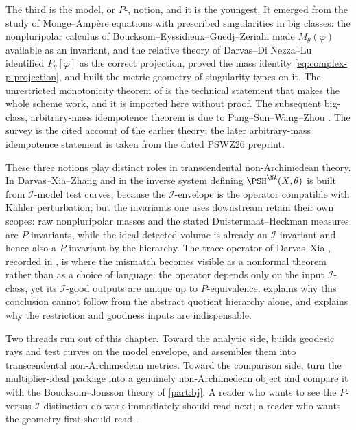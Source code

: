 The third is the model, or $P$-, notion, and it is the youngest.  It
emerged from the study of Monge--Amp\`ere equations with prescribed
singularities in big classes: the nonpluripolar calculus of
Boucksom--Eyssidieux--Guedj--Zeriahi \cite{BEGZ10} made
$M_\theta(\varphi)$ available as an invariant, and the relative theory
of Darvas--Di Nezza--Lu \cite{DDNL18mono,DDNL18big,DDNL18fullmass,%
DDNL19log,DDNLmetric} identified $P_\theta[\varphi]$ as the correct
projection, proved the mass identity \eqref{eq:complex-p-projection}, and
built the metric geometry of singularity types on it.  The unrestricted
monotonicity theorem of \cite{DDNL18mono} is the technical statement that
makes the whole scheme work, and it is imported here without proof.  The
subsequent big-class, arbitrary-mass idempotence theorem is due to
Pang--Sun--Wang--Zhou \cite{PSWZ26}.  The survey \cite{DDNLsurv} is the
cited account of the earlier theory; the later arbitrary-mass
idempotence statement is taken from the dated PSWZ26 preprint.

These three notions play distinct roles in transcendental
non-Archimedean theory.  In
Darvas--Xia--Zhang \cite{DXZ23} and in \cite{Xia21,Xia23Operations} the
inverse system defining $\PSH^{\NA}(X,\theta)$ is built from
$\mathcal I$-model test curves, because the $\mathcal I$-envelope is
the operator compatible with K\"ahler perturbation; but the invariants one
uses downstream retain their own scopes: raw nonpluripolar masses
and the stated Duistermaat--Heckman measures are $P$-invariants, while
the ideal-detected volume is already an $\mathcal I$-invariant and
hence also a $P$-invariant by the hierarchy.  The trace operator of
Darvas--Xia \cite{DX24},
recorded in , is where the mismatch becomes
visible as a nonformal theorem rather than as a choice of language: the
operator depends only on the input $\mathcal I$-class, yet its
$\mathcal I$-good outputs are unique up to $P$-equivalence.
 explains why this conclusion cannot follow from the
abstract quotient hierarchy alone, and 
explains why the restriction and goodness inputs are indispensable.

Two threads run out of this chapter.  Toward the analytic side,
 builds geodesic rays and test curves on the
model envelope, and  assembles them
into transcendental non-Archimedean metrics.  Toward the comparison side,
 turn the
multiplier-ideal package into a genuinely non-Archimedean object and
compare it with the Boucksom--Jonsson theory of \cref{part:bj}.  A reader
who wants to see the $P$-versus-$\mathcal I$ distinction do work
immediately should read  next; a reader who
wants the geometry first should read .

\endgroup
